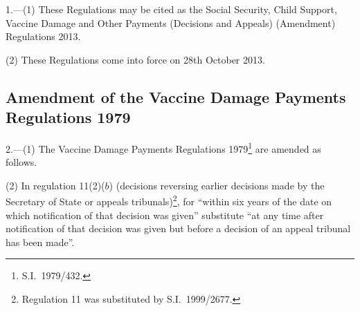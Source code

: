 \documentclass[12pt,a4paper]{article}
\begin{document}
1.---(1)  These Regulations may be cited as the Social Security, Child Support, Vaccine Damage and Other Payments (Decisions and Appeals) (Amendment) Regulations 2013.

(2) These Regulations come into force on 28th October 2013.

\subsection[2. Amendment of the Vaccine Damage Payments Regulations 1979]{Amendment of the Vaccine Damage Payments Regulations 1979}

2.---(1)  The Vaccine Damage Payments Regulations 1979\footnote{S.I.~1979/432.} are amended as follows.

(2) In regulation 11(2)($b$)  (decisions reversing earlier decisions made by the Secretary of State or appeals tribunals)\footnote{Regulation 11 was substituted by S.I.~1999/2677.}, for “within six years of the date on which notification of that decision was given” substitute “at any time after notification of that decision was given but before a decision of an appeal tribunal has been made”.
\end{document}
